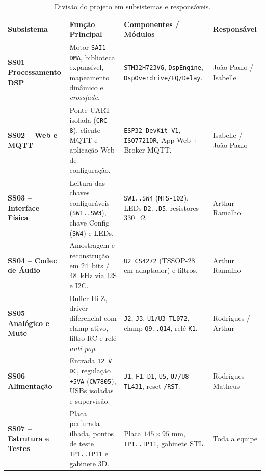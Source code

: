 \documentclass[12pt,openright,oneside,a4paper,brazil]{abntex2}
\begin{document}
\begin{table}[htbp]\centering\caption{Divisão do projeto em subsistemas e responsáveis.}\label{tab:subsistemas}
  \scriptsize
  \setlength{\tabcolsep}{3.5pt}
  \begin{tabularx}{\textwidth}{L{3.1cm}L{4.8cm}L{4.0cm}Y}
    \toprule
    \textbf{Subsistema} & \textbf{Função Principal} & \textbf{Componentes / Módulos} & \textbf{Responsável} \\
    \midrule
    \textbf{SS01 -- Processamento DSP} & Motor \texttt{SAI1 DMA}, biblioteca expansível, mapeamento dinâmico e \textit{crossfade}. & \texttt{STM32H723VG}, \texttt{DspEngine}, \texttt{DspOverdrive/EQ/Delay}. & João Paulo / Isabelle \\
    \textbf{SS02 -- Web e MQTT} & Ponte UART isolada (\texttt{CRC-8}), cliente MQTT e aplicação Web de configuração. & \texttt{ESP32 DevKit V1}, \texttt{ISO7721DR}, App Web + Broker MQTT. & Isabelle / João Paulo \\
    \textbf{SS03 -- Interface Física} & Leitura das chaves configuráveis (\texttt{SW1..SW3}), chave Config (\texttt{SW4}) e LEDs. & \texttt{SW1..SW4} (\texttt{MTS-102}), LEDs \texttt{D2..D5}, resistores $330\text{ }\Omega$. & Arthur Ramalho \\
    \textbf{SS04 -- Codec de Áudio} & Amostragem e reconstrução em 24~bits / 48~kHz via I2S e I2C. & \texttt{U2 CS4272} (TSSOP-28 em adaptador) e filtros. & Arthur Ramalho \\
    \textbf{SS05 -- Analógico e Mute} & Buffer Hi-Z, driver diferencial com clamp ativo, filtro RC e relé \textit{anti-pop}. & \texttt{J2}, \texttt{J3}, \texttt{U1/U3 TL072}, clamp \texttt{Q9..Q14}, relé \texttt{K1}. & Rodrigues / Arthur \\
    \textbf{SS06 -- Alimentação} & Entrada \texttt{12 V DC}, regulação \texttt{+5VA} (\texttt{CW7805}), USBs isoladas e supervisão. & \texttt{J1}, \texttt{F1}, \texttt{D1}, \texttt{U5}, \texttt{U7/U8 TL431}, reset \texttt{/RST}. & Rodrigues Matheus \\
    \textbf{SS07 -- Estrutura e Testes} & Placa perfurada ilhada, pontos de teste \texttt{TP1..TP11} e gabinete 3D. & Placa $145\times 95\text{ mm}$, \texttt{TP1..TP11}, gabinete STL. & Toda a equipe \\
    \bottomrule
  \end{tabularx}
\end{table}
\end{document}
